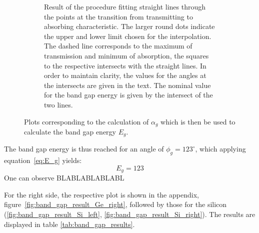 \begin{figure}
\begin{subfigure}[b]{\pltw}
        \caption{
            Result of the procedure fitting straight lines through the points 
            at the transition from transmitting to absorbing characteristic. 
            The larger round dots indicate the upper and lower limit 
            chosen for the interpolation. The dashed line corresponds to 
            the maximum of transmission and minimum of absorption, the 
            squares to the respective intersects with the straight lines.
            In order to maintain clarity, 
            the values for the angles at the intersects are given in the text. 
            The nominal value for the band gap energy is given by the intersect 
            of the two lines. 
            }
        \label{fig:band_gap_result_Ge_left}
    \end{subfigure}
    \caption{
        Plots corresponding to the calculation of $\alpha_g$ which is then be 
        used to calculate the band gap energy $E_g$. 
        }
    \label{fig:band_gap_result_Ge}
\end{figure}
The band gap energy is thus reached for an angle of $\phi_g = 123^\circ$, 
which applying equation~\eqref{eq:E_g} yields:
\begin{equation}
    E_g = 123
\end{equation}
One can observe BLABLABLABLABL

For the right side, the respective plot is shown in the appendix, 
figure~\ref{fig:band_gap_result_Ge_right}, followed by those for the 
silicon (\ref{fig:band_gap_result_Si_left}, \ref{fig:band_gap_result_Si_right}). 
The results are displayed in table \ref{tab:band_gap_results}.
